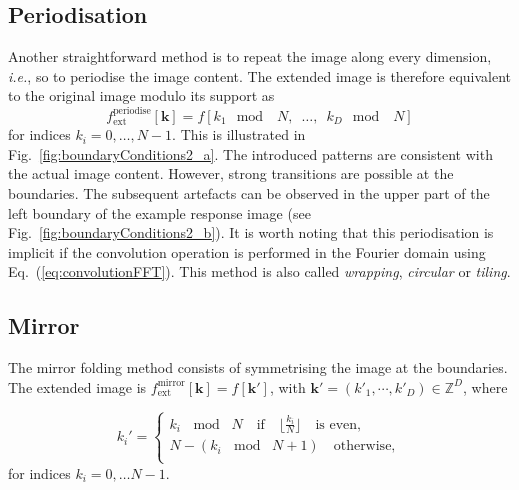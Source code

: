 \documentclass[fleqn,a4paper,oneside,openany]{book}
\begin{document}
\subsection{Periodisation}
%
Another straightforward method is to repeat the image along every dimension, \emph{i.e.}, so to periodise the image content.
The extended image is therefore equivalent to the original image modulo its support as
$$f_{\text{ext}}^{\text{periodise}}[\boldsymbol{k}]=f[k_1\mod\,\,\, N,\,\,\, \dots,\,\,\, k_D\mod\,\,\, N]$$
for indices $k_i = 0,\dots, N-1$.
This is illustrated in Fig.~\ref{fig:boundaryConditions2_a}.
The introduced patterns are consistent with the actual image content. 
However, strong transitions are possible at the boundaries.
The subsequent artefacts can be observed in the upper part of the left boundary of the example response image (see Fig.~\ref{fig:boundaryConditions2_b}).
It is worth noting that this periodisation is implicit if the convolution operation is performed in the Fourier domain using Eq.~(\ref{eq:convolutionFFT}).
This method is also called \textit{wrapping}, \textit{circular} or \textit{tiling}.
%
\subsection{Mirror}
%
The mirror folding method consists of symmetrising the image at the boundaries. The extended image is
$f_{\text{ext}}^{\text{mirror}}[\boldsymbol{k}]=f[\boldsymbol{k'}]$, with $\boldsymbol{k'} = (k'_1,\cdots,k'_D) \in \mathbb{Z}^D$, where

$$
k_i'=
\begin{cases}
  k_i \,\mod\,\, N \quad\text{if}\quad \lfloor \frac{k_i}{N}\rfloor\quad\text{is even},\\
  N - (k_i \,\mod\,\, N+1) \quad \text{otherwise},\\
 \end{cases}$$
for indices $k_i = 0,\dots N-1$.
\end{document}
